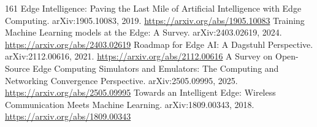 \documentclass[11pt]{article}
\begin{document}
\begin{thebibliography}{161}
 Edge Intelligence: Paving the Last Mile of Artificial Intelligence with Edge Computing. arXiv:1905.10083, 2019. \url{https://arxiv.org/abs/1905.10083}
 Training Machine Learning models at the Edge: A Survey. arXiv:2403.02619, 2024. \url{https://arxiv.org/abs/2403.02619}
 Roadmap for Edge AI: A Dagstuhl Perspective. arXiv:2112.00616, 2021. \url{https://arxiv.org/abs/2112.00616}
 A Survey on Open-Source Edge Computing Simulators and Emulators: The Computing and Networking Convergence Perspective. arXiv:2505.09995, 2025. \url{https://arxiv.org/abs/2505.09995}
 Towards an Intelligent Edge: Wireless Communication Meets Machine Learning. arXiv:1809.00343, 2018. \url{https://arxiv.org/abs/1809.00343}
\end{thebibliography}
\end{document}
